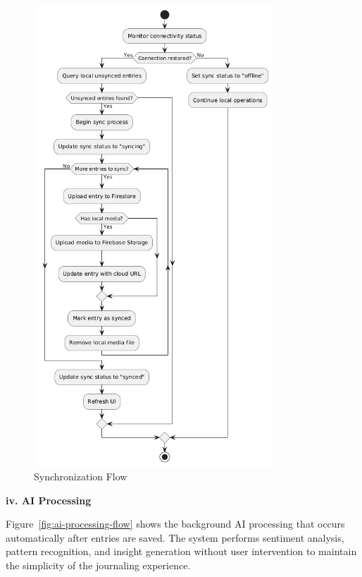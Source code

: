 \begin{figure}[H]
\centering
\includegraphics[width=0.8\textwidth]{files/imgs/sync_flow.png}
\caption{Synchronization Flow}
\label{fig:sync-flow}
\end{figure}
\clearpage

\textbf{iv. AI Processing}

Figure~\ref{fig:ai-processing-flow} shows the background AI processing that occurs automatically after entries are saved. The system performs sentiment analysis, pattern recognition, and insight generation without user intervention to maintain the simplicity of the journaling experience.

